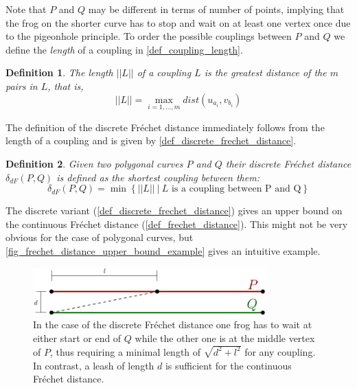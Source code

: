 \documentclass[
oneside,
fontsize=11pt
]{scrartcl}
\newtheorem{mydef}{Definition}
\begin{document}
Note that $P$ and $Q$ may be different in terms of number of points,
implying that the frog on the shorter curve 
has to stop and wait on at least one vertex once
due to the pigeonhole principle.
To order the possible couplings between $P$ and $Q$ we define the 
\textit{length} of a coupling in \autoref{def_coupling_length}. 

\begin{mydef}
  \label{def_coupling_length}
  The \textit{length} $||L||$ of a coupling $L$ is the greatest distance of the $m$ pairs in $L$, that is, 
  $$||L|| = \max_{i=1, \dots, m} dist(u_{a_i}, v_{b_i})$$
\end{mydef}

The definition of the discrete Fréchet distance immediately follows from 
the length of a coupling and is given by \autoref{def_discrete_frechet_distance}.

\begin{mydef}
  \label{def_discrete_frechet_distance}
  Given two polygonal curves $P$ and $Q$
  their discrete Fréchet distance $\delta_{dF}(P,Q)$ is defined as the shortest coupling between them: 
  $$\delta_{dF}(P,Q) = \min \left\{ ||L|| \ | \  L \text{ is a coupling between P and Q} \right\}$$
\end{mydef}

The discrete variant (\autoref{def_discrete_frechet_distance}) gives an upper bound on the continuous Fréchet distance (\autoref{def_frechet_distance}). 
This might not be very obvious for the case of polygonal curves, 
but \autoref{fig_frechet_distance_upper_bound_example} gives an intuitive example.

\begin{figure}[ht]
  \centering
  \includegraphics[width=0.8\textwidth]{images/frechet_distance/discrete-frechet-distance-upper-bound.pdf}
  \caption[Upper bound on Fréchet distance]{
    In the case of the discrete Fréchet distance 
    one frog has to wait at either start or end of $Q$
    while the other one is at the middle vertex of $P$, 
    thus requiring a minimal length of $\sqrt{d^2 + l^2}$ for any coupling.
    In contrast, a leash of length $d$ is sufficient for the continuous Fréchet distance.}
  \label{fig_frechet_distance_upper_bound_example}
\end{figure}
\end{document}
